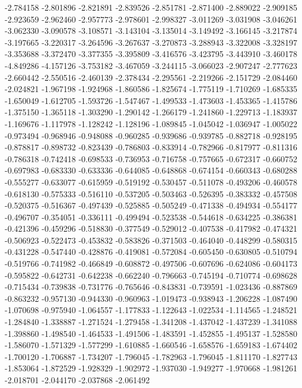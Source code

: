 -2.784158
-2.801896
-2.821891
-2.839526
-2.851781
-2.871400
-2.889022
-2.909185
-2.923659
-2.962460
-2.957773
-2.978601
-2.998327
-3.011269
-3.031908
-3.046261
-3.062330
-3.090578
-3.108571
-3.143104
-3.135014
-3.149492
-3.166145
-3.217874
-3.197665
-3.220317
-3.264596
-3.267637
-3.270873
-3.288943
-3.322008
-3.328197
-3.353688
-3.372470
-3.377355
-3.395809
-3.416576
-3.423795
-3.443910
-3.460178
-4.849286
-4.157126
-3.753182
-3.467059
-3.244115
-3.066023
-2.907247
-2.777623
-2.660442
-2.550516
-2.460139
-2.378434
-2.295561
-2.219266
-2.151729
-2.084460
-2.024821
-1.967198
-1.924968
-1.860586
-1.825674
-1.775119
-1.710269
-1.685335
-1.650049
-1.612705
-1.593726
-1.547467
-1.499533
-1.473603
-1.453365
-1.415786
-1.375150
-1.365118
-1.303290
-1.290142
-1.266179
-1.241860
-1.229713
-1.183937
-1.169676
-1.117978
-1.128242
-1.128196
-1.089845
-1.045042
-1.036947
-1.005022
-0.973494
-0.968946
-0.948088
-0.960285
-0.939686
-0.939785
-0.882718
-0.928195
-0.878817
-0.898732
-0.823439
-0.786803
-0.833914
-0.782966
-0.817977
-0.811316
-0.786318
-0.742418
-0.698533
-0.736953
-0.716758
-0.757665
-0.672317
-0.660752
-0.697983
-0.683330
-0.633336
-0.644085
-0.648868
-0.674154
-0.660343
-0.680288
-0.555277
-0.633077
-0.615959
-0.519192
-0.530457
-0.511078
-0.493206
-0.460578
-0.618130
-0.575333
-0.516110
-0.537205
-0.503463
-0.526395
-0.383332
-0.457508
-0.520375
-0.516367
-0.497439
-0.525885
-0.505249
-0.471338
-0.494934
-0.554177
-0.496707
-0.354051
-0.336111
-0.499494
-0.523538
-0.544618
-0.634225
-0.386381
-0.421396
-0.459296
-0.518830
-0.377549
-0.529012
-0.407538
-0.417982
-0.474321
-0.506923
-0.522473
-0.453832
-0.583826
-0.371503
-0.464040
-0.448299
-0.580315
-0.431228
-0.547440
-0.428876
-0.419081
-0.572084
-0.605450
-0.630805
-0.510794
-0.519766
-0.741982
-0.466849
-0.608872
-0.497506
-0.607696
-0.624086
-0.604173
-0.595822
-0.642731
-0.642238
-0.662240
-0.796663
-0.745194
-0.710774
-0.698628
-0.715434
-0.739838
-0.731776
-0.765646
-0.843831
-0.739591
-1.023436
-0.887869
-0.863232
-0.957130
-0.944330
-0.960963
-1.019473
-0.938943
-1.206228
-1.087490
-1.070698
-0.975940
-1.064557
-1.177833
-1.122643
-1.022534
-1.114565
-1.248521
-1.284840
-1.338887
-1.271524
-1.279458
-1.341208
-1.437042
-1.437239
-1.341088
-1.398860
-1.498540
-1.464533
-1.491506
-1.483591
-1.452855
-1.495137
-1.528580
-1.586070
-1.571329
-1.577299
-1.610885
-1.660546
-1.658576
-1.659183
-1.674402
-1.700120
-1.706887
-1.734207
-1.796045
-1.782963
-1.796045
-1.811170
-1.827743
-1.853064
-1.872529
-1.928329
-1.902972
-1.937030
-1.949277
-1.970668
-1.981261
-2.018701
-2.044170
-2.037868
-2.061492
